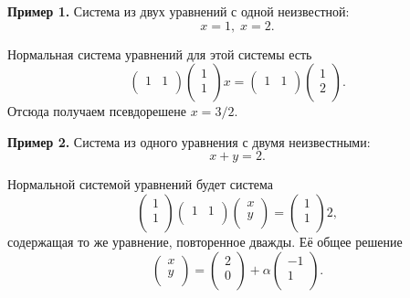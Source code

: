 \documentclass[11pt,a4paper]{article}
\begin{document}
\textbf{Пример 1.} Система из двух уравнений с одной неизвестной:
\[ x=1, \; x=2. \]

Нормальная система уравнений для этой системы есть \[
  \begin{pmatrix}
    1 & 1 \\
  \end{pmatrix}
  \begin{pmatrix}
    1 \\
    1 \\
  \end{pmatrix}
  x =
  \begin{pmatrix}
    1 & 1 \\
  \end{pmatrix}
  \begin{pmatrix}
    1 \\
    2 \\
  \end{pmatrix}.
\] Отсюда получаем псевдорешене \(x = 3/2\).

    \textbf{Пример 2.} Система из одного уравнения с двумя неизвестными:
\[ x + y = 2. \]

Нормальной системой уравнений будет система \[
  \begin{pmatrix}
    1 \\
    1 \\
  \end{pmatrix}
  \begin{pmatrix}
    1 & 1 \\
  \end{pmatrix}
  \begin{pmatrix}
    x \\
    y \\
  \end{pmatrix}
  =
  \begin{pmatrix}
    1 \\
    1 \\
  \end{pmatrix}
  2,
\] содержащая то же уравнение, повторенное дважды. Её общее решение \[
  \begin{pmatrix}
    x \\
    y \\
  \end{pmatrix}
  =
  \begin{pmatrix}
    2 \\
    0 \\
  \end{pmatrix}
  + \alpha
  \begin{pmatrix}
    -1 \\
    1 \\
  \end{pmatrix}.
\]
\end{document}
